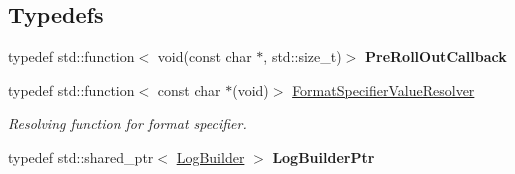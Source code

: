 \subsection*{Typedefs}
\begin{DoxyCompactItemize}
\item 
typedef std\+::function$<$ void(const char $\ast$, std\+::size\+\_\+t)$>$ {\bfseries Pre\+Roll\+Out\+Callback}\hypertarget{namespaceel_aeb764b890a6f3cd41d2726bcd4e9c0cf}{}\label{namespaceel_aeb764b890a6f3cd41d2726bcd4e9c0cf}

\item 
typedef std\+::function$<$ const char $\ast$(void)$>$ \hyperlink{namespaceel_ab3cd18425a11df166a041d9024b8b5c6}{Format\+Specifier\+Value\+Resolver}\hypertarget{namespaceel_ab3cd18425a11df166a041d9024b8b5c6}{}\label{namespaceel_ab3cd18425a11df166a041d9024b8b5c6}

\begin{DoxyCompactList}\small\item\em Resolving function for format specifier. \end{DoxyCompactList}\item 
typedef std\+::shared\+\_\+ptr$<$ \hyperlink{classel_1_1LogBuilder}{Log\+Builder} $>$ {\bfseries Log\+Builder\+Ptr}\hypertarget{namespaceel_ad4c4b2f7d70a4b02568a9f70724a6b39}{}\label{namespaceel_ad4c4b2f7d70a4b02568a9f70724a6b39}

\end{DoxyCompactItemize}

